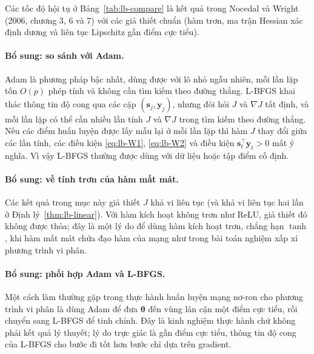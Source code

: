 Các tốc độ hội tụ ở Bảng~\ref{tab:lb-compare} là kết quả trong Nocedal và Wright (2006, chương 3, 6 và 7) với các giả thiết chuẩn (hàm trơn, ma trận Hessian xác định dương và liên tục Lipschitz gần điểm cực tiểu).

\paragraph{Bổ sung: so sánh với Adam.}
Adam là phương pháp bậc nhất, dùng được với lô nhỏ ngẫu nhiên, mỗi lần lặp tốn $O(p)$ phép tính và không cần tìm kiếm theo đường thẳng. L-BFGS khai thác thông tin độ cong qua các cặp $(\mathbf{s}_j,\mathbf{y}_j)$, nhưng đòi hỏi $J$ và $\nabla J$ tất định, và mỗi lần lặp có thể cần nhiều lần tính $J$ và $\nabla J$ trong tìm kiếm theo đường thẳng. Nếu các điểm huấn luyện được lấy mẫu lại ở mỗi lần lặp thì hàm $J$ thay đổi giữa các lần tính, các điều kiện \eqref{eq:lb-W1}, \eqref{eq:lb-W2} và điều kiện $\mathbf{s}_t^{\top}\mathbf{y}_t>0$ mất ý nghĩa. Vì vậy L-BFGS thường được dùng với dữ liệu hoặc tập điểm cố định.

\paragraph{Bổ sung: về tính trơn của hàm mất mát.}
Các kết quả trong mục này giả thiết $J$ khả vi liên tục (và khả vi liên tục hai lần ở Định lý~\ref{thm:lb-linear}). Với hàm kích hoạt không trơn như ReLU, giả thiết đó không được thỏa; đây là một lý do để dùng hàm kích hoạt trơn, chẳng hạn $\tanh$, khi hàm mất mát chứa đạo hàm của mạng như trong bài toán nghiệm xấp xỉ phương trình vi phân.

\paragraph{Bổ sung: phối hợp Adam và L-BFGS.}
Một cách làm thường gặp trong thực hành huấn luyện mạng nơ-ron cho phương trình vi phân là dùng Adam để đưa $\boldsymbol{\theta}$ đến vùng lân cận một điểm cực tiểu, rồi chuyển sang L-BFGS để tinh chỉnh. Đây là kinh nghiệm thực hành chứ không phải kết quả lý thuyết; lý do trực giác là gần điểm cực tiểu, thông tin độ cong của L-BFGS cho bước đi tốt hơn bước chỉ dựa trên gradient.